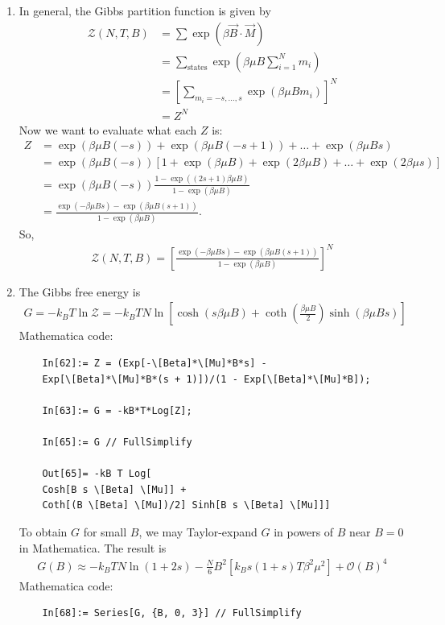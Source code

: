 \documentclass{article}
\theoremstyle{definition}
\newcommand{\be}{\beta}
\newcommand{\f}[2]{\frac{#1}{#2}}
\newcommand{\lp}{\left(}
\newcommand{\rp}{\right)}
\newcommand{\lb}{\left[}
\newcommand{\rb}{\right]}
\begin{document}
\begin{enumerate}[label=(\alph*)]
	\item In general, the Gibbs partition function is given by 
	\begin{align*}
	\mathcal{Z}(N,T,B) 
	&= \sum \exp(\be\vec{B}\cdot \vec{M}) \\
	&= \sum_{\text{states}} \exp\lp \be \mu B\sum_{i=1}^N m_i\rp \\
	&= \lb \sum_{m_i = -s,\dots , s} \exp\lp \be \mu B m_i\rp \rb^N\\
	&= {Z}^N
	\end{align*}
	Now we want to evaluate what each $Z$ is:
	\begin{align*}
	Z 
	&= \exp(\be\mu B (-s)) + \exp(\be\mu B (-s+1)) + \dots + \exp(\be\mu B s)\\ 
	&= \exp(\be\mu B (-s))\lb 1 + \exp(\be\mu B) + \exp(2\be\mu B) + \dots + \exp(2\be\mu s) \rb\\
	&= \exp(\be\mu B (-s)) \f{1 - \exp((2s+1)\be\mu B)}{1-\exp(\be\mu B)} \\
	&= \f{\exp(-\be\mu Bs) - \exp(\be\mu B(s+1))}{1-\exp(\be\mu B)}.
	\end{align*}
	So, 
	\begin{align*}
	\boxed{\mathcal{Z}(N,T,B) = \lb \f{\exp(-\be\mu Bs) - \exp(\be\mu B(s+1))}{1-\exp(\be\mu B)}\rb^N}
	\end{align*}
	
	
	\item The Gibbs free energy is 
	\begin{align*}
	\boxed{G = -k_B T \ln \mathcal{Z} = -k_B T N\ln \lb \cosh(s \be\mu B) + \coth(\f{\be\mu B}{2})\sinh(\be\mu B s) \rb}
	\end{align*}
	Mathematica code:
	\begin{lstlisting}
	In[62]:= Z = (Exp[-\[Beta]*\[Mu]*B*s] - 
	Exp[\[Beta]*\[Mu]*B*(s + 1)])/(1 - Exp[\[Beta]*\[Mu]*B]);
	
	In[63]:= G = -kB*T*Log[Z];
	
	In[65]:= G // FullSimplify
	
	Out[65]= -kB T Log[
	Cosh[B s \[Beta] \[Mu]] + 
	Coth[(B \[Beta] \[Mu])/2] Sinh[B s \[Beta] \[Mu]]]
	\end{lstlisting}
	
	
	To obtain $G$ for small $B$, we may Taylor-expand $G$ in powers of $B$ near $B=0$ in Mathematica. The result is 
	\begin{align*}
	G(B) \approx -k_B T N\ln (1+2s) -\f{N}{6} B^2 \lb k_B s (1+s) T \be^2 \mu^2  \rb  + \mathcal{O}(B)^4
	\end{align*}
	Mathematica code:
	\begin{lstlisting}
	In[68]:= Series[G, {B, 0, 3}] // FullSimplify
	

\end{lstlisting}
\end{enumerate}
\end{document}

